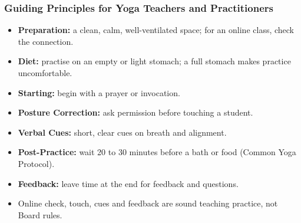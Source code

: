 \begin{frame}[fragile]\frametitle{Guiding Principles for Yoga Teachers and Practitioners}

	\begin{itemize} 
	\item \textbf{Preparation:} a clean, calm, well-ventilated space; for an online class, check the connection.
	\item \textbf{Diet:} practise on an empty or light stomach; a full stomach makes practice uncomfortable.
	\item \textbf{Starting:} begin with a prayer or invocation.
	\item \textbf{Posture Correction:} ask permission before touching a student.
	\item \textbf{Verbal Cues:} short, clear cues on breath and alignment.
	\item \textbf{Post-Practice:} wait 20 to 30 minutes before a bath or food (Common Yoga Protocol).
	\item \textbf{Feedback:} leave time at the end for feedback and questions.
	\item Online check, touch, cues and feedback are sound teaching practice, not Board rules. \end{itemize}

\end{frame}


